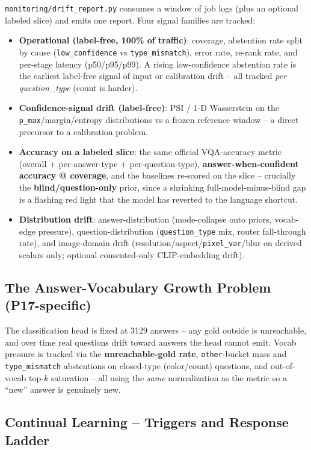 \documentclass[12pt,a4paper]{article}
\begin{document}
\texttt{monitoring/drift\_report.py} consumes a window of job logs (plus an optional labeled slice) and emits one report. Four signal families are tracked:
\begin{itemize}\setlength\itemsep{0.15em}
  \item \textbf{Operational (label-free, 100\% of traffic)}: coverage, abstention rate split by cause (\texttt{low\_confidence} vs \texttt{type\_mismatch}), error rate, re-rank rate, and per-stage latency (p50/p95/p99). A rising low-confidence abstention rate is the earliest label-free signal of input or calibration drift -- all tracked \emph{per question\_type} (count is harder).
  \item \textbf{Confidence-signal drift (label-free)}: PSI / 1-D Wasserstein on the \texttt{p\_max}/margin/entropy distributions vs a frozen reference window -- a direct precursor to a calibration problem.
  \item \textbf{Accuracy on a labeled slice}: the same official VQA-accuracy metric (overall $+$ per-answer-type $+$ per-question-type), \textbf{answer-when-confident accuracy @ coverage}, and the baselines re-scored on the slice -- crucially the \textbf{blind/question-only} prior, since a shrinking full-model-minus-blind gap is a flashing red light that the model has reverted to the language shortcut.
  \item \textbf{Distribution drift}: answer-distribution (mode-collapse onto priors, vocab-edge pressure), question-distribution (\texttt{question\_type} mix, router fall-through rate), and image-domain drift (resolution/aspect/\texttt{pixel\_var}/blur on derived scalars only; optional consented-only CLIP-embedding drift).
\end{itemize}

\subsection{The Answer-Vocabulary Growth Problem (P17-specific)}

The classification head is fixed at 3129 answers -- any gold outside is unreachable, and over time real questions drift toward answers the head cannot emit. Vocab pressure is tracked via the \textbf{unreachable-gold rate}, \texttt{other}-bucket mass and \texttt{type\_mismatch} abstentions on closed-type (color/count) questions, and out-of-vocab top-$k$ saturation -- all using the \emph{same} normalization as the metric so a ``new'' answer is genuinely new.

\subsection{Continual Learning -- Triggers and Response Ladder}
\end{document}
